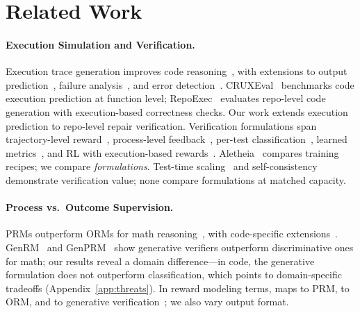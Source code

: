 \section{Related Work}
\label{sec:related_work}

\paragraph{Execution Simulation and Verification.}
Execution trace generation improves code reasoning~\cite{nye2021scratchpad}, with extensions to output prediction~\cite{meta2025cwm,maimon2026selfexecution,liu2024codemind,liu2023codeexecutor,lee2026solidcoder}, failure analysis~\cite{abdollahi2025demystifying}, and error detection~\cite{li2024redo}. CRUXEval~\citep{gu2024cruxeval} benchmarks code execution prediction at function level; RepoExec~\citep{nam2025repoexec} evaluates repo-level code generation with execution-based correctness checks. Our work extends execution prediction to repo-level repair verification. Verification formulations span trajectory-level reward~\cite{shum2025swerm}, process-level feedback~\cite{li2025codeprm,xu2025patchreasoner}, per-test classification~\cite{ni2023lever,chen2023codet}, learned metrics~\cite{zhuo2024icescore,dong2024codescore,zhou2023codebertscore}, and RL with execution-based rewards~\cite{wang2026verpo,tang2026execverify}. Aletheia~\cite{venkatkrishna2026aletheia} compares training recipes; we compare \emph{formulations}. Test-time scaling~\cite{snell2024scaling,li2025sstar,chen2025vgsearch} and self-consistency~\cite{wang2023selfconsistency} demonstrate verification value; none compare formulations at matched capacity.

\paragraph{Process vs.\ Outcome Supervision.}
PRMs outperform ORMs for math reasoning~\cite{lightman2023letsverify,uesato2022solving}, with code-specific extensions~\cite{ye2025prlcoder,zhang2026funprm,jiang2025coderlplus,li2025codeprm}. GenRM~\cite{hosseini2025genrm} and GenPRM~\cite{zhao2026genprm} show generative verifiers outperform discriminative ones for math; our results reveal a domain difference---in code, the generative formulation does not outperform classification, which points to domain-specific tradeoffs (Appendix~\ref{app:threats}). In reward modeling terms, \cls{} maps to PRM, \traj{} to ORM, and \cwm{} to generative verification~\cite{hosseini2025genrm}; we also vary output format.

